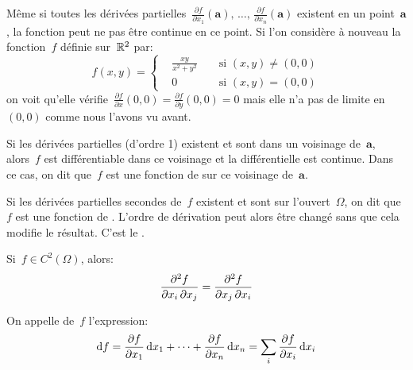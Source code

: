 \medskip
{}
Même si toutes les dérivées partielles~$\frac{ \partial f}{\partial x_1}(\mathbf{a}),\, \dots,\, \frac{ \partial f}{\partial x_n}(\mathbf{a})$ existent en un point~$\mathbf{a}$, la fonction peut ne pas être continue en ce point.
Si l'on considère à nouveau la fonction~$f$ définie sur~$\mathbb R^2$ par:
\begin{equation}
  f(x,y)=\left\{\begin{aligned}&\frac{xy}{x^2+y^2}&&\text{ si } (x,y)\neq(0,0)\\
&0&&\text{ si } (x,y)=(0,0)\end{aligned}\right.
\end{equation}
on voit qu'elle vérifie~$\frac{\partial f}{\partial x} (0,0)= \frac{\partial f}{\partial y} (0,0)=0$ mais elle n'a pas de limite en~$(0,0)$ comme nous l'avons vu avant.


\medskip
Si  les dérivées partielles (d'ordre 1) existent et sont  dans un voisinage de~$\mathbf{a}$, alors~$f$ est différentiable dans ce voisinage et la différentielle est continue. Dans ce cas, on dit que~$f$ est une fonction de  sur ce voisinage de~$\mathbf{a}$.

Si  les dérivées partielles secondes de~$f$ existent et sont  sur l'ouvert~$\Omega$, on dit que~$f$ est une fonction de .
L'ordre de dérivation peut alors être changé sans que cela modifie le résultat.
C'est le  .
\begin{theoreme}
Si~$f\in C^2(\Omega)$, alors:
\begin{equation}\colorred
  \frac{\partial^2f}{\partial x_i\, \partial x_j} = \frac{\partial^2f} {\partial x_j\, \partial x_i}
\end{equation}
\end{theoreme}

\begin{definition}
On appelle  de~$f$ l'expression:
\begin{equation}
  \text{d} f=\frac{\partial f}{\partial x_1}\,\text{d} x_1+\cdots+\frac{\partial f}{\partial x_n}\,\text{d} x_n
=  \displaystyle\sum_i \frac{\partial f}{\partial x_i}\,\text{d} x_i
\end{equation}
\end{definition}

